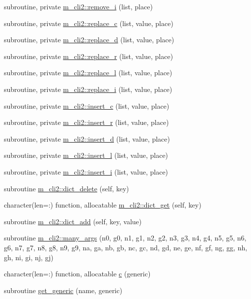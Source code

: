 \begin{DoxyCompactItemize}
\item 
subroutine, private \mbox{\hyperlink{namespacem__cli2_a1c2bd26b3c04a499cc65b00133dfe6b9}{m\+\_\+cli2\+::remove\+\_\+i}} (list, place)
\item 
subroutine, private \mbox{\hyperlink{namespacem__cli2_affd644ac84d1010b40748f80d142d6b3}{m\+\_\+cli2\+::replace\+\_\+c}} (list, value, place)
\item 
subroutine, private \mbox{\hyperlink{namespacem__cli2_ac327823dd714cd4c1667666158f0c135}{m\+\_\+cli2\+::replace\+\_\+d}} (list, value, place)
\item 
subroutine, private \mbox{\hyperlink{namespacem__cli2_abe681a8b55ae238b029766713a79210a}{m\+\_\+cli2\+::replace\+\_\+r}} (list, value, place)
\item 
subroutine, private \mbox{\hyperlink{namespacem__cli2_ae4a1802207f6b67e36cbf89003d6fb55}{m\+\_\+cli2\+::replace\+\_\+l}} (list, value, place)
\item 
subroutine, private \mbox{\hyperlink{namespacem__cli2_a0a591fd55e8010f26eb6f9f6bafc1ddb}{m\+\_\+cli2\+::replace\+\_\+i}} (list, value, place)
\item 
subroutine, private \mbox{\hyperlink{namespacem__cli2_ab3f2aa827b3b7ff419bcdc3ccb2672b3}{m\+\_\+cli2\+::insert\+\_\+c}} (list, value, place)
\item 
subroutine, private \mbox{\hyperlink{namespacem__cli2_ae43e655d3678fcc31824a3e9db3daae1}{m\+\_\+cli2\+::insert\+\_\+r}} (list, value, place)
\item 
subroutine, private \mbox{\hyperlink{namespacem__cli2_a737ae8e6f73a3fc8cc260732c047fafb}{m\+\_\+cli2\+::insert\+\_\+d}} (list, value, place)
\item 
subroutine, private \mbox{\hyperlink{namespacem__cli2_a7e5ee66813d8f6db9d48ebdc350a6b3e}{m\+\_\+cli2\+::insert\+\_\+l}} (list, value, place)
\item 
subroutine, private \mbox{\hyperlink{namespacem__cli2_afa6f00a57f1252ba5daa0c440a23ffbb}{m\+\_\+cli2\+::insert\+\_\+i}} (list, value, place)
\item 
subroutine \mbox{\hyperlink{namespacem__cli2_afcdd2c59305faf341ebf8ec3b115a05e}{m\+\_\+cli2\+::dict\+\_\+delete}} (self, key)
\item 
character(len=\+:) function, allocatable \mbox{\hyperlink{namespacem__cli2_a5b489c992f1434fa27e7858a483a38c7}{m\+\_\+cli2\+::dict\+\_\+get}} (self, key)
\item 
subroutine \mbox{\hyperlink{namespacem__cli2_a601a06b7038b524abababc8d437ee823}{m\+\_\+cli2\+::dict\+\_\+add}} (self, key, value)
\item 
subroutine \mbox{\hyperlink{namespacem__cli2_a2d1a2b245e9a5e5897e5bff0afc2a217}{m\+\_\+cli2\+::many\+\_\+args}} (n0, g0, n1, g1, n2, g2, n3, g3, n4, g4, n5, g5, n6, g6, n7, g7, n8, g8, n9, g9, na, ga, nb, gb, nc, gc, nd, gd, ne, ge, nf, gf, ng, gg, nh, gh, ni, gi, nj, gj)
\item 
character(len=\+:) function, allocatable \mbox{\hyperlink{M__CLI2_8f90_a8e39955a72727c584de84fedd23a25c4}{c}} (generic)
\item 
subroutine \mbox{\hyperlink{M__CLI2_8f90_a63bc2e1acc64ef4241b6419c18d80877}{get\+\_\+generic}} (name, generic)
\end{DoxyCompactItemize}
